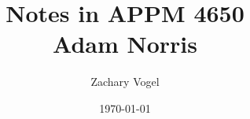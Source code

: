 \documentclass{article}
\begin{document}
\author{Zachary Vogel}
\date{\today}
\title{Notes in APPM 4650\\Adam Norris}

\maketitle



\section{}
\end{document}
